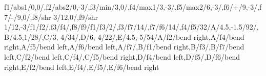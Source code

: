\begin{compatibilitygraph}{f1/abs1/{0,0}/,f2/abs2/{0,-3}/,f3/min/{3,0}/,f4/max1/{3,-3}/,f5/max2/{6,-3}/,f6/+/{9,-3}/,f7/-/{9,0}/,f8/shr 3/{12,0}/,f9/shr 1/{12,-3}/}{f1/f2/,f3/f4/,f8/f9/}{f1/f3/2/,f3/f7/14/,f7/f6/14/,f4/f5/32/}{A/{4.5,-1.5}/92/,B/{4.5,1}/28/,C/{3,-4}/34/,D/{6,-4}/22/,E/{4.5,-5}/54/}{A/f2/bend right,A/f4/bend right,A/f5/bend left,A/f6/bend left,A/f7/,B/f1/bend right,B/f3/,B/f7/bend left,C/f2/bend left,C/f4/,C/f5/bend right,D/f4/bend left,D/f5/,D/f6/bend right,E/f2/bend left,E/f4/,E/f5/,E/f6/bend right}
\end{compatibilitygraph}